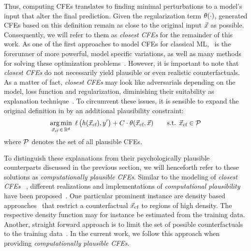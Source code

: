 Thus, computing \glspl{CFE} translates to finding minimal perturbations to a model's input that alter the final prediction. Given the regularization term $\operatorname*{{\theta}}(\cdot)$, generated \glspl{CFE} based on this definition remain as close to the original input $\vec{x}$ as possible. Consequently, we will refer to them as \textit{closest \glspl{CFE}} for the remainder of this work.
As one of the first approaches to model \glspl{CFE} for classical \gls{ML},~ is the 
forerunner of more powerful, model specific variations, as well as many methods for solving these optimization problems~\citep{verma_counterfactual_2020,artelt_computation_2019,karimi_survey_2020}.
However, it is important to note that \textit{closest \glspl{CFE}} do not necessarily yield plausible or even realistic counterfactuals.
As a matter of fact, \textit{closest \glspl{CFE}} may look like adversarials depending on the model, loss function and regularization, diminishing their suitability as explanation technique~\citep{laugel_issues_2019}.
To circumvent these issues, it is sensible to expand the original definition in  by an additional plausibility constraint:
\begin{equation}
\begin{split}
\underset{{\vec{x}_{\text{cf}}} \,\in\, \mathbb{R}^d}{\arg\min}\; \operatorname*{{\ell}}\big(h({\vec{x}_{\text{cf}}}), y'\big) + C \cdot \operatorname*{{\theta}}({\vec{x}_{\text{cf}}}, \vec{x}) \quad\quad \text{s.t. } {\vec{x}_{\text{cf}}} \in \mathcal{P}
\end{split}
\end{equation}
where $\mathcal{P}$ denotes the set of all plausible \glspl{CFE}.

To distinguish these explanations from their psychologically plausible counterparts discussed in the previous section, we will henceforth refer to these solutions as \textit{computationally plausible \glspl{CFE}}.
Similar to the modeling of \textit{closest \glspl{CFE}} ~, different realizations and implementations of \textit{computational plausibility} have been proposed~\citep{looveren_interpretable_2019,poyiadzi_face_2019,artelt_convex_2020}. 
One particular prominent instance are density based approaches~\citep{artelt_convex_2020} that restrict a counterfactual ${\vec{x}_{\text{cf}}}$ to regions of high density. 
The respective density function may for instance be estimated from the training data.
Another, straight forward approach is to limit the set of possible counterfactuals to the training data~\citep{poyiadzi_face_2019}. 
In the current work, we follow this approach when providing \textit{computationally plausible \glspl{CFE}}.

